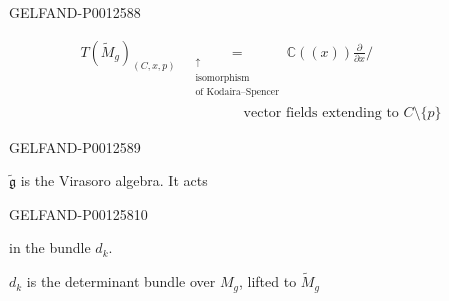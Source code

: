 \begin{GelfandAdjacentEvidence}{GELFAND-P001258}{8}

\begin{equation*}
\begin{aligned}
T(\widetilde M_g)_{(C,x,p)}
&\underset{\substack{\uparrow\\\text{isomorphism}\\\text{of Kodaira–Spencer}}}{=}
\mathbb C((x))\frac{\partial}{\partial x}\big/\\[-2pt]
&\hspace{4em}\text{vector fields extending to }C\setminus\{p\}
\end{aligned}
\end{equation*}
\begin{flushright}\end{flushright}
\end{GelfandAdjacentEvidence}
\begin{GelfandAdjacentEvidence}{GELFAND-P001258}{9}


$\widetilde{\mathfrak g}$ is the Virasoro algebra.
It acts
\end{GelfandAdjacentEvidence}
\begin{GelfandAdjacentEvidence}{GELFAND-P001258}{10}

in the bundle $d_k$.
\end{GelfandAdjacentEvidence}

$d_k$ is the determinant bundle over $M_g$, lifted to $\widetilde M_g$


